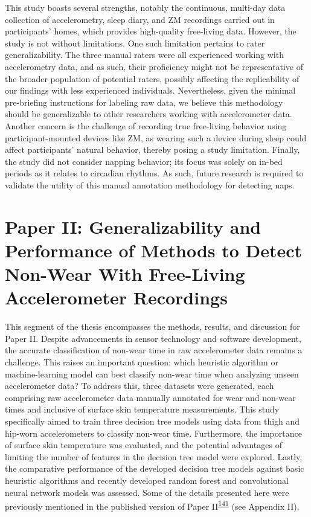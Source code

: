 \documentclass[
  10pt,
]{scrbook}
\begin{document}
This study boasts several strengths, notably the continuous, multi-day
data collection of accelerometry, sleep diary, and ZM recordings carried
out in participants' homes, which provides high-quality free-living
data. However, the study is not without limitations. One such limitation
pertains to rater generalizability. The three manual raters were all
experienced working with accelerometry data, and as such, their
proficiency might not be representative of the broader population of
potential raters, possibly affecting the replicability of our findings
with less experienced individuals. Nevertheless, given the minimal
pre-briefing instructions for labeling raw data, we believe this
methodology should be generalizable to other researchers working with
accelerometer data. Another concern is the challenge of recording true
free-living behavior using participant-mounted devices like ZM, as
wearing such a device during sleep could affect participants' natural
behavior, thereby posing a study limitation. Finally, the study did not
consider napping behavior; its focus was solely on in-bed periods as it
relates to circadian rhythms. As such, future research is required to
validate the utility of this manual annotation methodology for detecting
naps.

\hypertarget{paper-ii-generalizability-and-performance-of-methods-to-detect-non-wear-with-free-living-accelerometer-recordings}{%
\chapter{Paper II: Generalizability and Performance of Methods to Detect
Non-Wear With Free-Living Accelerometer
Recordings}\label{paper-ii-generalizability-and-performance-of-methods-to-detect-non-wear-with-free-living-accelerometer-recordings}}

This segment of the thesis encompasses the methods, results, and
discussion for Paper II. Despite advancements in sensor technology and
software development, the accurate classification of non-wear time in
raw accelerometer data remains a challenge. This raises an important
question: which heuristic algorithm or machine-learning model can best
classify non-wear time when analyzing unseen accelerometer data? To
address this, three datasets were generated, each comprising raw
accelerometer data manually annotated for wear and non-wear times and
inclusive of surface skin temperature measurements. This study
specifically aimed to train three decision tree models using data from
thigh and hip-worn accelerometers to classify non-wear time.
Furthermore, the importance of surface skin temperature was evaluated,
and the potential advantages of limiting the number of features in the
decision tree model were explored. Lastly, the comparative performance
of the developed decision tree models against basic heuristic algorithms
and recently developed random forest and convolutional neural network
models was assessed. Some of the details presented here were previously
mentioned in the published version of Paper
II\textsuperscript{\protect\hyperlink{ref-skovgaard_generalizability_2023}{141}}
(see Appendix II).
\end{document}
